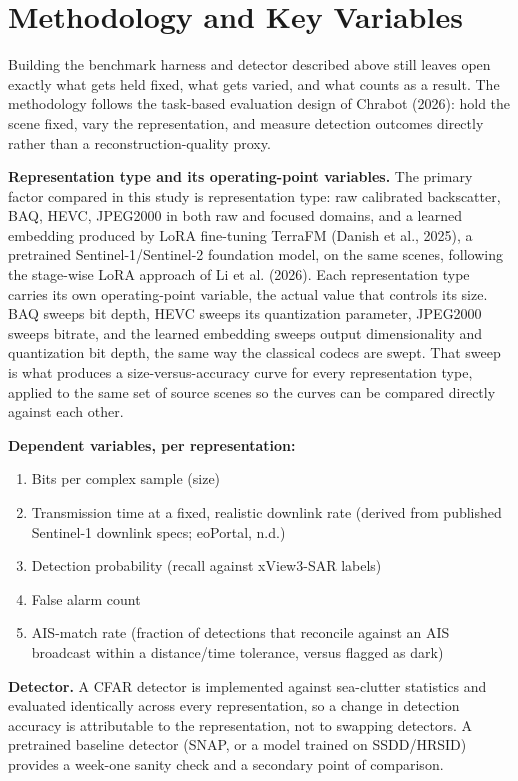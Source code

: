\documentclass[11pt]{article}
\begin{document}
\section{Methodology and Key Variables}

Building the benchmark harness and detector described above still leaves open exactly what gets held fixed, what gets varied, and what counts as a result. The methodology follows the task-based evaluation design of Chrabot (2026): hold the scene fixed, vary the representation, and measure detection outcomes directly rather than a reconstruction-quality proxy.

\textbf{Representation type and its operating-point variables.} The primary factor compared in this study is representation type: raw calibrated backscatter, BAQ, HEVC, JPEG2000 in both raw and focused domains, and a learned embedding produced by LoRA fine-tuning TerraFM (Danish et al., 2025), a pretrained Sentinel-1/Sentinel-2 foundation model, on the same scenes, following the stage-wise LoRA approach of Li et al. (2026). Each representation type carries its own operating-point variable, the actual value that controls its size. BAQ sweeps bit depth, HEVC sweeps its quantization parameter, JPEG2000 sweeps bitrate, and the learned embedding sweeps output dimensionality and quantization bit depth, the same way the classical codecs are swept. That sweep is what produces a size-versus-accuracy curve for every representation type, applied to the same set of source scenes so the curves can be compared directly against each other.

\textbf{Dependent variables, per representation:}
\begin{enumerate}[label=(\roman*), leftmargin=*]
\item Bits per complex sample (size)
\item Transmission time at a fixed, realistic downlink rate (derived from published Sentinel-1 downlink specs; eoPortal, n.d.)
\item Detection probability (recall against xView3-SAR labels)
\item False alarm count
\item AIS-match rate (fraction of detections that reconcile against an AIS broadcast within a distance/time tolerance, versus flagged as dark)
\end{enumerate}

\textbf{Detector.} A CFAR detector is implemented against sea-clutter statistics and evaluated identically across every representation, so a change in detection accuracy is attributable to the representation, not to swapping detectors. A pretrained baseline detector (SNAP, or a model trained on SSDD/HRSID) provides a week-one sanity check and a secondary point of comparison.
\end{document}
